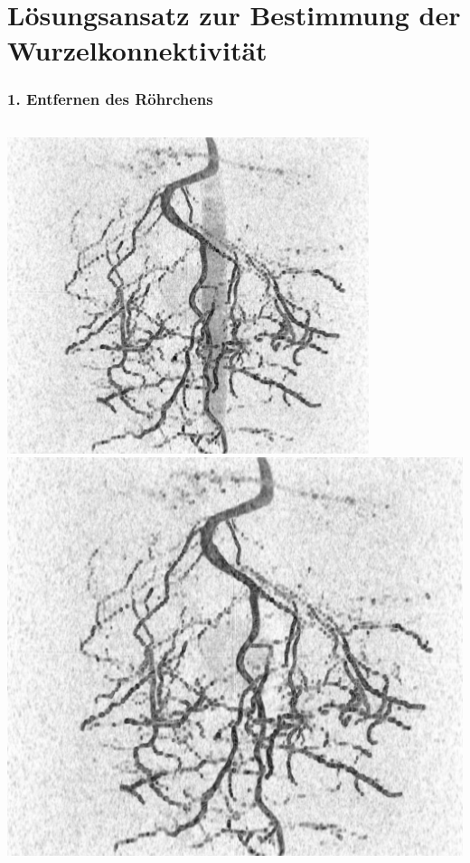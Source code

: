 \documentclass[final,ngerman,ignorenonframetext,compress]{beamer}
\begin{document}
\section{L\"osungsansatz zur Bestimmung der Wurzelkonnektivit\"at}
\begin{frame}
	\frametitle{1. Entfernen des R\"ohrchens}
	\begin{columns}
		\includegraphics[width=\linewidth]{img/raw-4.png}
		\includegraphics[width=\linewidth]{img2/raw-4.png}
	\end{columns}
\end{frame}
\end{document}
